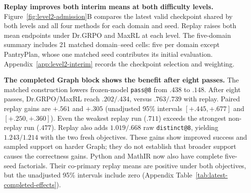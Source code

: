 \documentclass{article}
\newcommand{\1}{\mathbf 1}
\theoremstyle{remark}
\theoremstyle{definition}
\theoremstyle{plain}
\begin{document}
\textbf{Replay improves both interim means at both difficulty levels.}
Figure~\ref{fig:level2-admission}B compares the latest valid checkpoint shared
by both levels and all four methods for each domain and seed. Replay raises
both mean endpoints under Dr.GRPO and MaxRL at each level. The five-domain
summary includes 21 matched domain--seed cells: five per domain except
PantryPlan, whose one matched seed contributes its initial evaluation.
Appendix~\ref{app:level2-interim} records the checkpoint selection and weighting.

\textbf{The completed Graph block shows the benefit after eight passes.}
The matched construction lowers frozen-model \texttt{pass@8} from
\(.438\) to \(.148\). After eight passes, Dr.GRPO/MaxRL reach \(.202/.434\),
versus \(.763/.739\) with replay. Paired replay gains are \(+.561\) and
\(+.305\) (unadjusted 95\% intervals \([+.445,+.677]\) and
\([+.250,+.360]\)). Even the weakest replay run (\(.711\)) exceeds the
strongest non-replay run (\(.477\)). Replay also adds \(1.019/.668\) raw
\texttt{distinct@8}, yielding \(1.243/1.214\) with the two fresh objectives.
These gains show improved success and sampled support on harder Graph;
they do not establish that broader support causes the correctness gains.
Python and MathIR now also have complete five-seed factorials. Their co-primary
replay means are positive under both objectives, but the unadjusted 95\% intervals
include zero (Appendix Table~\ref{tab:latest-completed-effects}).

\long{}
\end{document}
